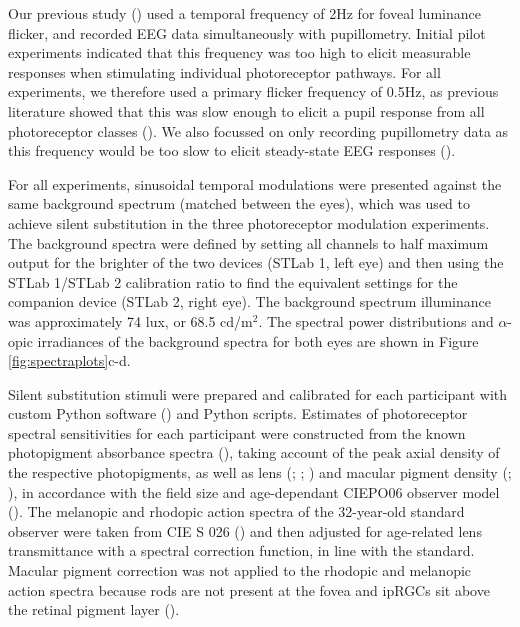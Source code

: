 \documentclass[
]{article}
\begin{document}
Our previous study () used a temporal frequency of 2Hz for foveal luminance flicker, and recorded EEG data simultaneously with pupillometry. Initial pilot experiments indicated that this frequency was too high to elicit measurable responses when stimulating individual photoreceptor pathways. For all experiments, we therefore used a primary flicker frequency of 0.5Hz, as previous literature showed that this was slow enough to elicit a pupil response from all photoreceptor classes (). We also focussed on only recording pupillometry data as this frequency would be too slow to elicit steady-state EEG responses ().

For all experiments, sinusoidal temporal modulations were presented against the same background spectrum (matched between the eyes), which was used to achieve silent substitution in the three photoreceptor modulation experiments. The background spectra were defined by setting all channels to half maximum output for the brighter of the two devices (STLab 1, left eye) and then using the STLab 1/STLab 2 calibration ratio to find the equivalent settings for the companion device (STLab 2, right eye). The background spectrum illuminance was approximately 74 lux, or 68.5 cd/m\(^2\). The spectral power distributions and \(\alpha\)-opic irradiances of the background spectra for both eyes are shown in Figure \ref{fig:spectraplots}c-d.

Silent substitution stimuli were prepared and calibrated for each participant with custom Python software () and Python scripts. Estimates of photoreceptor spectral sensitivities for each participant were constructed from the known photopigment absorbance spectra (), taking account of the peak axial density of the respective photopigments, as well as lens (; ; ) and macular pigment density (; ), in accordance with the field size and age-dependant CIEPO06 observer model (). The melanopic and rhodopic action spectra of the 32-year-old standard observer were taken from CIE S 026 () and then adjusted for age-related lens transmittance with a spectral correction function, in line with the standard. Macular pigment correction was not applied to the rhodopic and melanopic action spectra because rods are not present at the fovea and ipRGCs sit above the retinal pigment layer ().
\end{document}
